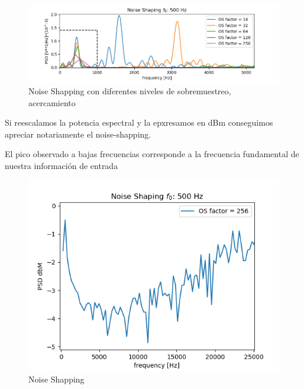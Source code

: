 \begin{figure}[H]
	\centering
	\includegraphics[width=\linewidth]{ImagenesEjercicio2/NoiseShappingSolidZoom.png}
	\caption{Noise Shapping con diferentes niveles de sobremuestreo, acercamiento}
	\label{fig:noiseshappingdemo1}
\end{figure}

Si reescalamos la potencia espectral y la epxresamos en dBm conseguimos apreciar notariamente el noise-shapping.

El pico observado a bajas frecuencias corresponde a la frecuencia fundamental de nuestra información de entrada
\begin{figure}[H]
	\centering
	\includegraphics[scale=0.7]{ImagenesEjercicio2/NoiseShappingdbM.png}
	\caption{Noise Shapping}
	\label{fig:noiseshappingdemo1}
\end{figure}


